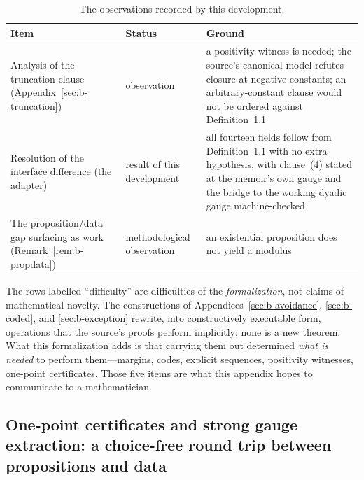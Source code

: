 \documentclass[11pt]{article}
\theoremstyle{definition}
\theoremstyle{remark}
\begin{document}
\begin{table}[htbp]
\centering\small
\caption{The observations recorded by this development.}
\label{tab:observed}
\setlength{\tabcolsep}{3pt}
\begin{tabular}{p{}p{}p{}}
\hline
Item & Status & Ground \\
\hline
Analysis of the truncation clause (Appendix~\ref{sec:b-truncation}) & observation & a positivity witness is needed; the source's canonical model refutes closure at negative constants; an arbitrary-constant clause would not be ordered against Definition~1.1 \\
Resolution of the interface difference (the adapter) & result of this development & all fourteen fields follow from Definition~1.1 with no extra hypothesis, with clause~(4) stated at the memoir's own gauge and the bridge to the working dyadic gauge machine-checked \\
The proposition/data gap surfacing as work (Remark~\ref{rem:b-propdata}) & methodological observation & an existential proposition does not yield a modulus \\

\hline
\end{tabular}
\end{table}

The rows labelled ``difficulty'' are difficulties of the \emph{formalization}, not claims of mathematical novelty.  The constructions of Appendices~\ref{sec:b-avoidance}, \ref{sec:b-coded}, and \ref{sec:b-exception} rewrite, into constructively executable form, operations that the source's proofs perform implicitly; none is a new theorem.  What this formalization adds is that carrying them out determined \emph{what is needed} to perform them---margins, codes, explicit sequences, positivity witnesses, one-point certificates.  Those five items are what this appendix hopes to communicate to a mathematician.

\subsection{One-point certificates and strong gauge extraction: a choice-free round trip between propositions and data}
\label{sec:b-onepoint}
\end{document}
